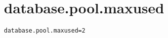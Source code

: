 \section{database.pool.maxused}
\label{configuration:DatabasePoolMaxused}
\AvailableInJavaOnly{\TODO}
\begin{lstlisting}[style=Props,caption={Usage example for \textit{database.pool.maxused}}]
database.pool.maxused=2
\end{lstlisting}